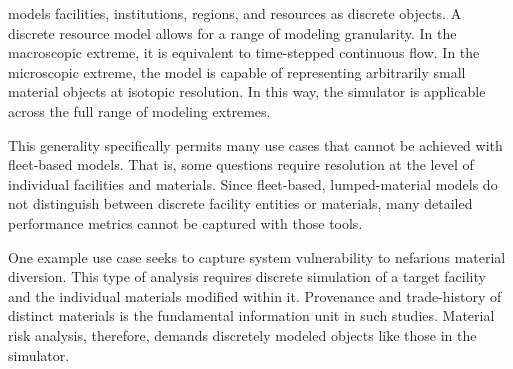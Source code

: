 \Cyclus models facilities, institutions, regions, and resources as discrete 
objects. A discrete resource model allows for a range of modeling granularity. In the
macroscopic extreme, it is equivalent to time-stepped continuous flow. In the
microscopic extreme, the model is capable of representing arbitrarily small 
material objects at isotopic resolution. In this way, the \Cyclus simulator is 
applicable across the full range of modeling extremes. 

This generality specifically permits many use cases that cannot be achieved with 
fleet-based models. That is, some questions require resolution at the level of 
individual facilities and materials.  Since fleet-based, 
lumped-material models do not distinguish between discrete facility entities or 
materials, many detailed performance metrics cannot be captured with 
those tools. 

One example use case seeks to capture system vulnerability to nefarious 
material diversion. This type of analysis requires discrete simulation of a 
target facility and the individual materials modified within it. 
Provenance and trade-history of distinct materials is the fundamental 
information unit in such studies. 
Material risk analysis, therefore, demands discretely modeled objects like those 
in the \Cyclus simulator.

